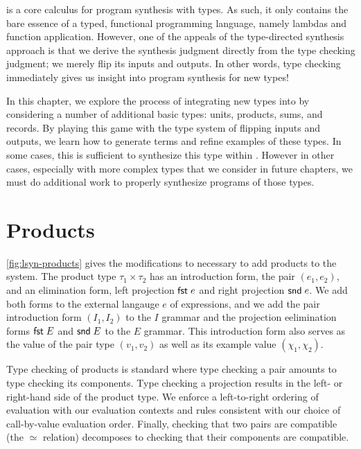 \lsyn{} is a core calculus for program synthesis with types.
As such, it only contains the bare essence of a typed, functional programming language, namely lambdas and function application.
However, one of the appeals of the type-directed synthesis approach is that we derive the synthesis judgment directly from the type checking judgment; we merely flip its inputs and outputs.
In other words, type checking immediately gives us insight into program synthesis for new types!

In this chapter, we explore the process of integrating new types into \lsyn{} by considering a number of additional basic types: units, products, sums, and records.
By playing this game with the type system of flipping inputs and outputs, we learn how to generate terms and refine examples of these types.
In some cases, this is sufficient to synthesize this type within \lsyn{}.
However in other cases, especially with more complex types that we consider in future chapters, we must do additional work to properly synthesize programs of those types.


\section{Products}



\autoref{fig:lsyn-products} gives the modifications to \lsyn{} necessary to add products to the system.
The product type $τ_1 × τ_2$ has an introduction form, the pair $(e_1, e_2)$, and an elimination form, left projection $\mathsf{fst}\;e$ and right projection $\mathsf{snd}\;e$.
We add both forms to the external langauge $e$ of expressions, and we add the pair introduction form $(I_1, I_2)$ to the $I$ grammar and the projection eelimination forms $\mathsf{fst}\;E$ and $\mathsf{snd}\;E$ to the $E$ grammar.
This introduction form also serves as the value of the pair type $(v_1, v_2)$ as well as its example value $(χ_1, χ_2)$.

Type checking of products is standard where type checking a pair amounts to type checking its components.
Type checking a projection results in the left- or right-hand side of the product type.
We enforce a left-to-right ordering of evaluation with our evaluation contexts and rules consistent with our choice of call-by-value evaluation order.
Finally, checking that two pairs are compatible (the $≃$ relation) decomposes to checking that their components are compatible.

